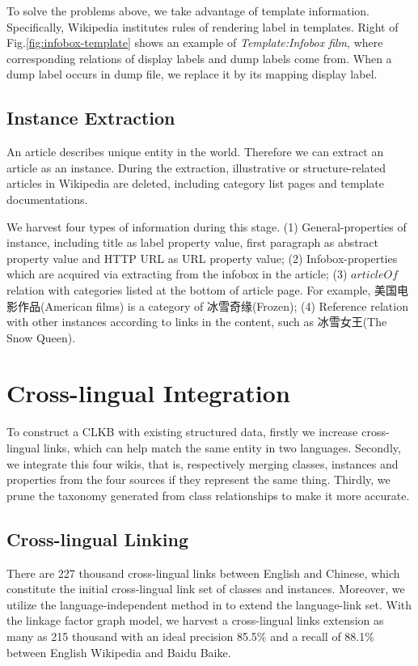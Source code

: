 \documentclass[runningheads,a4paper]{llncs}
\begin{document}
To solve the problems above, we take advantage of template information. Specifically, Wikipedia institutes rules of rendering label in templates. Right of Fig.\ref{fig:infobox-template} shows an example of \emph{Template:Infobox film}, where corresponding relations of display labels and dump labels come from. When a dump label occurs in dump file, we replace it by its mapping display label.

\subsection{Instance Extraction}
\label{sec:ie}
An article describes unique entity in the world. Therefore we can extract an article as an instance. During the extraction, illustrative or structure-related articles in Wikipedia are deleted, including category list pages and template documentations.

We harvest four types of information during this stage. (1) General-properties of instance, including title as label property value, first paragraph as abstract property value and HTTP URL as URL property value; (2) Infobox-properties which are acquired via extracting from the infobox in the article; (3) $articleOf$ relation with categories listed at the bottom of article page. For example, 美国电影作品(American films) is a category of 冰雪奇缘(Frozen); (4) Reference relation with other instances according to links in the content, such as 冰雪女王(The Snow Queen).

\section{Cross-lingual Integration}
\label{sec:cli}

To construct a CLKB with existing structured data, firstly we increase cross-lingual links, which can help match the same entity in two languages. Secondly, we integrate this four wikis, that is, respectively merging classes, instances and properties from the four sources if they represent the same thing. Thirdly, we prune the taxonomy generated from class relationships to make it more accurate.

\subsection{Cross-lingual Linking}
There are 227 thousand cross-lingual links between English and Chinese, which constitute the initial cross-lingual link set of classes and instances. Moreover, we utilize the language-independent method in \cite{wang2012cross} to extend the language-link set. With the linkage factor graph model, we harvest a cross-lingual links extension as many as 215 thousand with an ideal precision 85.5\% and a recall of 88.1\% between English Wikipedia and Baidu Baike.
\end{document}
